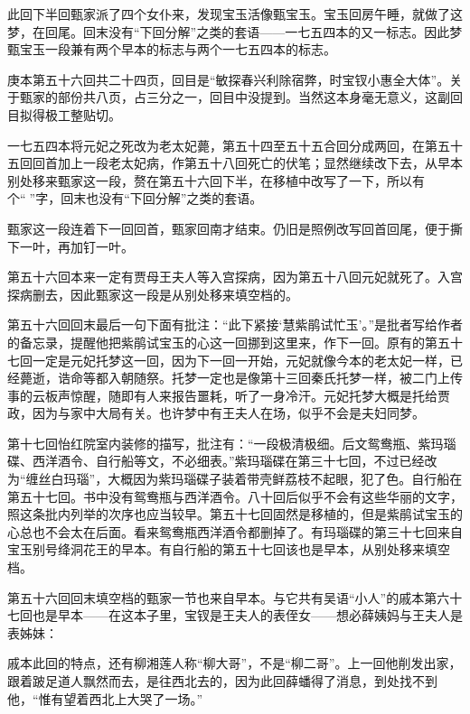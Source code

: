 \par 此回下半回甄家派了四个女仆来，发现宝玉活像甄宝玉。宝玉回房午睡，就做了这梦，在回尾。回末没有“下回分解”之类的套语——一七五四本的又一标志。因此梦甄宝玉一段兼有两个早本的标志与两个一七五四本的标志。
\par 庚本第五十六回共二十四页，回目是“敏探春兴利除宿弊，时宝钗小惠全大体”。关于甄家的部份共八页，占三分之一，回目中没提到。当然这本身毫无意义，这副回目拟得极工整贴切。
\par 一七五四本将元妃之死改为老太妃薨，第五十四至五十五合回分成两回，在第五十五回回首加上一段老太妃病，作第五十八回死亡的伏笔；显然继续改下去，从早本别处移来甄家这一段，赘在第五十六回下半，在移植中改写了一下，所以有个“𤞘”字，回末也没有“下回分解”之类的套语。
\par 甄家这一段连着下一回回首，甄家回南才结束。仍旧是照例改写回首回尾，便于撕下一叶，再加钉一叶。
\par 第五十六回本来一定有贾母王夫人等入宫探病，因为第五十八回元妃就死了。入宫探病删去，因此甄家这一段是从别处移来填空档的。
\par 第五十六回回末最后一句下面有批注：“此下紧接‘慧紫鹃试忙玉’。”是批者写给作者的备忘录，提醒他把紫鹃试宝玉的心这一回挪到这里来，作下一回。原有的第五十七回一定是元妃托梦这一回，因为下一回一开始，元妃就像今本的老太妃一样，已经薨逝，诰命等都入朝随祭。托梦一定也是像第十三回秦氏托梦一样，被二门上传事的云板声惊醒，随即有人来报告噩耗，听了一身冷汗。元妃托梦大概是托给贾政，因为与家中大局有关。也许梦中有王夫人在场，似乎不会是夫妇同梦。
\par 第十七回怡红院室内装修的描写，批注有：“一段极清极细。后文鸳鸯瓶、紫玛瑙碟、西洋酒令、自行船等文，不必细表。”紫玛瑙碟在第三十七回，不过已经改为“缠丝白玛瑙”，大概因为紫玛瑙碟子装着带壳鲜荔枝不起眼，犯了色。自行船在第五十七回。书中没有鸳鸯瓶与西洋酒令。八十回后似乎不会有这些华丽的文字，照这条批内列举的次序也应当较早。第五十七回固然是移植的，但是紫鹃试宝玉的心总也不会太在后面。看来鸳鸯瓶西洋酒令都删掉了。有玛瑙碟的第三十七回来自宝玉别号绛洞花王的早本。有自行船的第五十七回该也是早本，从别处移来填空档。
\par 第五十六回回末填空档的甄家一节也来自早本。与它共有吴语“小人”的戚本第六十七回也是早本——在这本子里，宝钗是王夫人的表侄女——想必薛姨妈与王夫人是表姊妹：
\par 戚本此回的特点，还有柳湘莲人称“柳大哥”，不是“柳二哥”。上一回他削发出家，跟着跛足道人飘然而去，是往西北去的，因为此回薛蟠得了消息，到处找不到他，“惟有望着西北上大哭了一场。”
